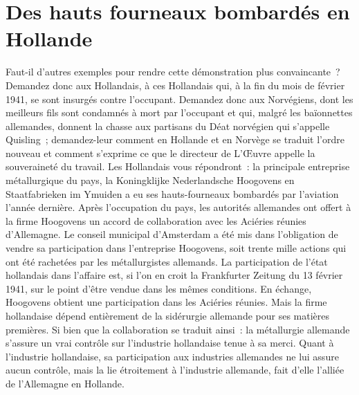 \documentclass[french,twoside]{book} %
\begin{document}
\section[{Des hauts fourneaux bombardés en Hollande}]{Des hauts fourneaux bombardés en Hollande}
\noindent Faut-il d’autres exemples pour rendre cette démonstration plus convaincante ? Demandez donc aux Hollandais, à ces Hollandais qui, à la fin du mois de février 1941, se sont insurgés contre l’occupant. Demandez donc aux Norvégiens, dont les meilleurs fils sont condamnés à mort par l’occupant et qui, malgré les baïonnettes allemandes, donnent la chasse aux partisans du Déat norvégien qui s’appelle Quisling ; demandez-leur comment en Hollande et en Norvège se traduit l’ordre nouveau et comment s’exprime ce que le directeur de L’Œuvre appelle la souveraineté du travail. Les Hollandais vous répondront : la principale entreprise métallurgique du pays, la Koningklijke Nederlandsche Hoogovens en Staatfabrieken im Ymuiden a eu ses hauts-fourneaux bombardés par l’aviation l’année dernière. Après l’occupation du pays, les autorités allemandes ont offert à la firme Hoogovens un accord de collaboration avec les Aciéries réunies d’Allemagne. Le conseil municipal d’Amsterdam a été mis dans l’obligation de vendre sa participation dans l’entreprise Hoogovens, soit trente mille actions qui ont été rachetées par les métallurgistes allemands. La participation de l’état hollandais dans l’affaire est, si l’on en croit la Frankfurter Zeitung du 13 février 1941, sur le point d’être vendue dans les mêmes conditions. En échange, Hoogovens obtient une participation dans les Aciéries réunies. Mais la firme hollandaise dépend entièrement de la sidérurgie allemande pour ses matières premières. Si bien que la collaboration se traduit ainsi : la métallurgie allemande s’assure un vrai contrôle sur l’industrie hollandaise tenue à sa merci. Quant à l’industrie hollandaise, sa participation aux industries allemandes ne lui assure aucun contrôle, mais la lie étroitement à l’industrie allemande, fait d’elle l’alliée de l’Allemagne en Hollande.
\end{document}
